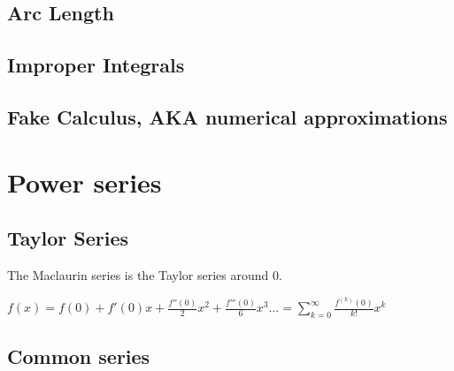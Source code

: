 \documentclass[a4paper,11pt]{article}
\begin{document}

    \subsection{Arc Length}

    \subsection{Improper Integrals}


    \subsection{Fake Calculus, AKA numerical approximations}

    \section{Power series} %

    \subsection{Taylor Series}

    The Maclaurin series is the Taylor series around $0$.

    $\displaystyle
     f(x) = f(0) + f'(0) x + \frac{f''(0)} 2 x^2 + \frac{f'''(0)}{6}x^3 \ldots
     = \sum_{k=0}^\infty \frac{f^{(k)}(0)}{k!}x^k$

    \subsection{Common series}
\end{document}

